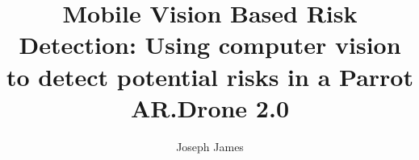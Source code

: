 
\title{Mobile Vision Based Risk Detection:
Using computer vision to detect potential risks in a
Parrot AR.Drone 2.0}

\author{Joseph James}




\date{} %



\maketitle



